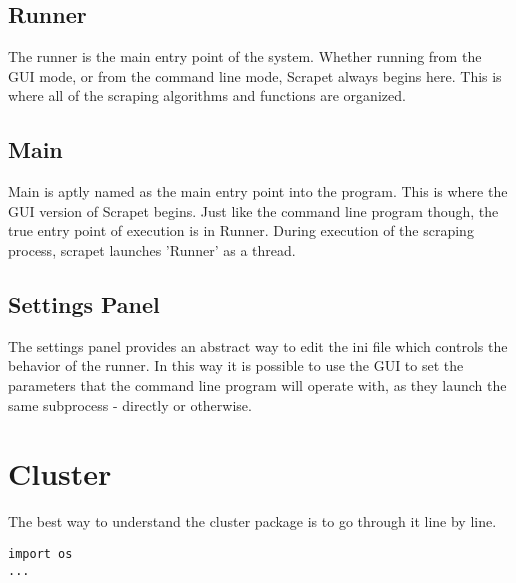 \subsection{Runner}
The runner is the main entry point of the system. Whether running from
the GUI mode, or from the command line mode, Scrapet always begins
here. This is where all of the scraping algorithms and functions are
organized.

\subsection{Main}
Main is aptly named as the main entry point into the program. This is
where the GUI version of Scrapet begins. Just like the command line
program though, the true entry point of execution is in Runner. During
execution of the scraping process, scrapet launches 'Runner' as a
thread.

\subsection{Settings Panel}
The settings panel provides an abstract way to edit the ini file which
controls the behavior of the runner. In this way it is possible to use
the GUI to set the parameters that the command line program will
operate with, as they launch the same subprocess - directly or
otherwise.

\section{Cluster}
The best way to understand the cluster package is to go through it
line by line.

\begin{lstlisting}
import os
...
\end{lstlisting}
